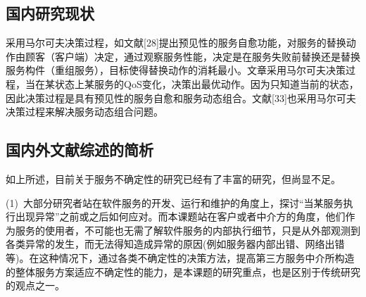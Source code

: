 %
%


\subsection{国内研究现状}
采用马尔可夫决策过程，如文献[28]提出预见性的服务自愈功能，对服务的替换动作由顾客（客户端）决定，通过观察服务性能，决定是在服务失败前替换还是替换服务构件（重组服务），目标使得替换动作的消耗最小。文章采用马尔可夫决策过程，当在某状态上某服务的QoS变化，决策出最优动作。因为只知道当前的状态，因此决策过程是具有预见性的服务自愈和服务动态组合。文献[33]也采用马尔可夫决策过程来解决服务动态组合问题。


\subsection{国内外文献综述的简析}
如上所述，目前关于服务不确定性的研究已经有了丰富的研究，但尚显不足。

(1)~大部分研究者站在软件服务的开发、运行和维护的角度上，探讨“当某服务执行出现异常”之前或之后如何应对。而本课题站在客户或者中介方的角度，他们作为服务的使用者，不可能也无需了解软件服务的内部执行细节，只是从外部观测到各类异常的发生，而无法得知造成异常的原因(例如服务器内部出错、网络出错等)。在这种情况下，通过各类不确定性的决策方法，提高第三方服务中介所构造的整体服务方案适应不确定性的能力，是本课题的研究重点，也是区别于传统研究的观点之一。

